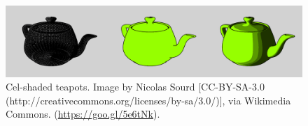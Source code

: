 \begin{figure}[ht]
  \centering
  \includegraphics[width=\linewidth]{fig/teapots.png}
  \caption{Cel-shaded teapots. Image by Nicolas Sourd [CC-BY-SA-3.0 (http://creativecommons.org/licenses/by-sa/3.0/)], via Wikimedia Commons. (\url{https://goo.gl/5e6tNk}).}
\end{figure}